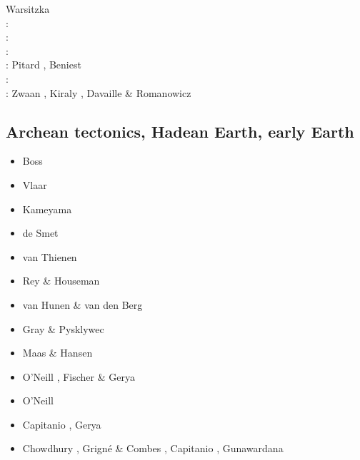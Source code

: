 {                    Warsitzka \etal \cite{wakk13}\\
\twothousandfifteen: \cite{casw15}\cite{rods15}\cite{kiff15}\cite{chsd15}\\
\twothousandsixteen: \cite{scbb16}\cite{chss16}\\
\twothousandseventeen: \cite{casw17}\\
\twothousandeighteen: Pitard \etal \cite{pirf18}, Beniest \etal \cite{bews18} \\
\twothousandnineteen: \cite{mocb19}\cite{sccs19}\cite{muwm19}\cite{fegb19}\\
\twothousandtwenty: Zwaan \etal \cite{zwsr20}, Kiraly \etal \cite{kiph20},
                    Davaille \& Romanowicz \cite{daro20}
}

\subsection{Archean tectonics, Hadean Earth, early Earth}

\begin{scriptsize}
\begin{itemize}
\item[\nineteeneightyfour] Boss \etal \cite{boas84}
\item[\nineteenninetyfour] Vlaar \etal \cite{vlvv94}
\item[\nineteenninetysix] Kameyama \etal \cite{kafo96}
\item[\twothousand] de Smet \etal \cite{devv00b}
\item[\twothousandfour] van Thienen \etal \cite{vavv04,vavv04b}
\item[\twothousandsix] Rey \& Houseman \cite{reho06}
\item[\twothousandeight] van Hunen \& van den Berg \cite{vava08}
\item[\twothousandten] Gray \& Pysklywec \cite{grpy10}
\item[\twothousandfifteen] Maas \& Hansen \cite{maha15}
\item[\twothousandsixteen] O'Neill \cite{onlw16}, Fischer \& Gerya \cite{fige16}
\item[\twothousandseventeen] O'Neill \etal \cite{onmz17}
\item[\twothousandnineteen] Capitanio \etal \cite{canc19}, Gerya \cite{gery19}
\item[\twothousandtwenty] Chowdhury \etal{} \cite{chcg20}, Grign\'e \& Combes \cite{grco20},
                          Capitanio \etal \cite{canc20}, Gunawardana \etal \cite{gumc20}
\end{itemize}
\end{scriptsize}

